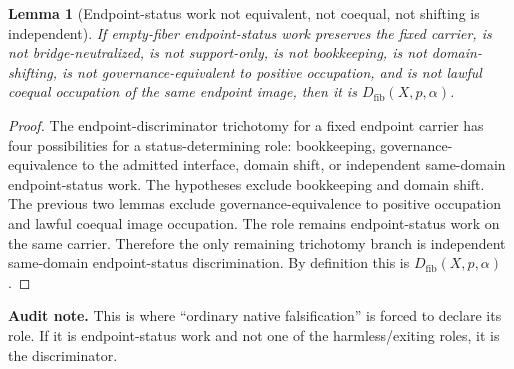 \documentclass[11pt]{article}
\newtheorem{lemma}[theorem]{Lemma}
\begin{document}
\begin{lemma}[Endpoint-status work not equivalent, not coequal, not shifting is independent]
If empty-fiber endpoint-status work preserves the fixed carrier, is not bridge-neutralized, is not support-only, is not bookkeeping, is not domain-shifting, is not governance-equivalent to positive occupation, and is not lawful coequal occupation of the same endpoint image, then it is $D_{\mathrm{fib}}(X,p,\alpha)$.
\end{lemma}
\begin{proof}
The endpoint-discriminator trichotomy for a fixed endpoint carrier has four possibilities for a status-determining role: bookkeeping, governance-equivalence to the admitted interface, domain shift, or independent same-domain endpoint-status work. The hypotheses exclude bookkeeping and domain shift. The previous two lemmas exclude governance-equivalence to positive occupation and lawful coequal image occupation. The role remains endpoint-status work on the same carrier. Therefore the only remaining trichotomy branch is independent same-domain endpoint-status discrimination. By definition this is $D_{\mathrm{fib}}(X,p,\alpha)$.
\end{proof}
\par\noindent\textbf{Audit note.} This is where ``ordinary native falsification'' is forced to declare its role. If it is endpoint-status work and not one of the harmless/exiting roles, it is the discriminator.
\end{document}
